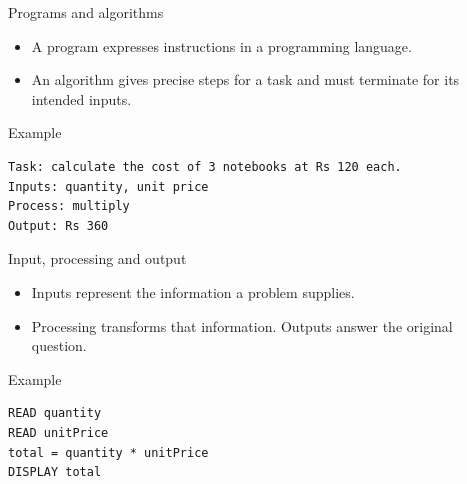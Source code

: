 \documentclass[10pt,aspectratio=169]{beamer}
\begin{document}
\begin{frame}[fragile,t]{Programs and algorithms}
\begin{itemize}
\item A program expresses instructions in a programming language.
\item An algorithm gives precise steps for a task and must terminate for its intended inputs.
\end{itemize}
\vspace{1mm}\begin{block}{Example}
\begin{lstlisting}
Task: calculate the cost of 3 notebooks at Rs 120 each.
Inputs: quantity, unit price
Process: multiply
Output: Rs 360
\end{lstlisting}
\end{block}
\end{frame}

\begin{frame}[fragile,t]{Input, processing and output}
\begin{itemize}
\item Inputs represent the information a problem supplies.
\item Processing transforms that information. Outputs answer the original question.
\end{itemize}
\vspace{1mm}\begin{block}{Example}
\begin{lstlisting}
READ quantity
READ unitPrice
total = quantity * unitPrice
DISPLAY total
\end{lstlisting}
\end{block}
\end{frame}
\end{document}

